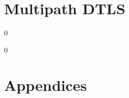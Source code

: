 \documentclass[11pt,a4paper,oldfontcommands]{memoir}
\newcommand\draft{0}
\begin{document}
\markboth{}{}
\part{Multipath DTLS}
\fi
\draft
\fi




\draft
\clearpage
\markboth{}{}
\part*{Appendices}

\appendix


\fi
\end{document}

